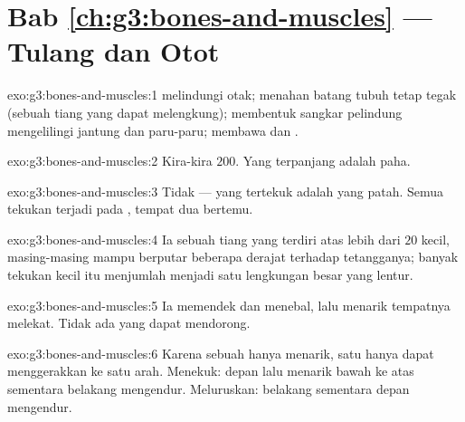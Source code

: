 \section*{Bab \ref{ch:g3:bones-and-muscles} --- Tulang dan Otot}

\begin{solution}{exo:g3:bones-and-muscles:1}
 melindungi otak;  menahan batang tubuh tetap
tegak (sebuah tiang yang dapat melengkung);  membentuk
sangkar pelindung mengelilingi jantung dan paru-paru;   membawa  dan .
\end{solution}

\begin{solution}{exo:g3:bones-and-muscles:2}
Kira-kira $200$. Yang terpanjang adalah  paha.
\end{solution}

\begin{solution}{exo:g3:bones-and-muscles:3}
Tidak ---  yang tertekuk adalah  yang patah. Semua tekukan
terjadi pada , tempat dua  bertemu.
\end{solution}

\begin{solution}{exo:g3:bones-and-muscles:4}
Ia sebuah tiang yang terdiri atas lebih dari $20$  kecil,
masing-masing mampu berputar beberapa derajat terhadap tetangganya;
banyak tekukan kecil itu menjumlah menjadi satu lengkungan besar yang
lentur.
\end{solution}

\begin{solution}{exo:g3:bones-and-muscles:5}
Ia memendek dan menebal, lalu menarik  tempatnya melekat. Tidak
ada  yang dapat mendorong.
\end{solution}

\begin{solution}{exo:g3:bones-and-muscles:6}
Karena sebuah  hanya menarik, satu  hanya dapat menggerakkan
 ke satu arah. Menekuk:  depan  lalu menarik
 bawah ke atas sementara  belakang mengendur. Meluruskan:
 belakang  sementara  depan mengendur.
\end{solution}

